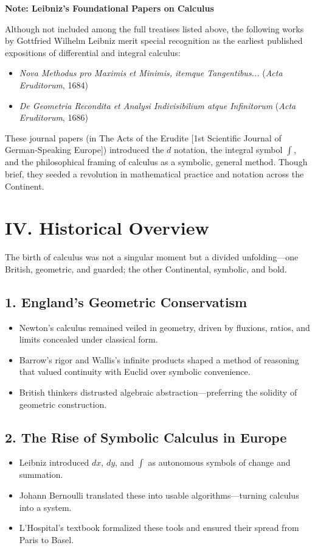 \documentclass[9pt]{article}
\begin{document}
\vspace{1em}
\noindent
\textbf{Note: Leibniz's Foundational Papers on Calculus}

\noindent
Although not included among the full treatises listed above, the following works by Gottfried Wilhelm Leibniz merit special recognition as the earliest published expositions of differential and integral calculus:

\begin{itemize}
  \item \textit{Nova Methodus pro Maximis et Minimis, itemque Tangentibus...} (\textit{Acta Eruditorum}, 1684)
  \item \textit{De Geometria Recondita et Analysi Indivisibilium atque Infinitorum} (\textit{Acta Eruditorum}, 1686)
\end{itemize}

These journal papers (in The Acts of the Erudite [1st Scientific Journal of German-Speaking Europe]) introduced the $d$ notation, the integral symbol $\int$, and the philosophical framing of calculus as a symbolic, general method. Though brief, they seeded a revolution in mathematical practice and notation across the Continent.

\newpage

\section*{IV. Historical Overview}

The birth of calculus was not a singular moment but a divided unfolding—one British, geometric, and guarded; the other Continental, symbolic, and bold.

\subsection*{1. England’s Geometric Conservatism}
\begin{itemize}
  \item Newton's calculus remained veiled in geometry, driven by fluxions, ratios, and limits concealed under classical form.
  \item Barrow's rigor and Wallis's infinite products shaped a method of reasoning that valued continuity with Euclid over symbolic convenience.
  \item British thinkers distrusted algebraic abstraction—preferring the solidity of geometric construction.
\end{itemize}

\subsection*{2. The Rise of Symbolic Calculus in Europe}
\begin{itemize}
  \item Leibniz introduced $dx$, $dy$, and $\int$ as autonomous symbols of change and summation.
  \item Johann Bernoulli translated these into usable algorithms—turning calculus into a system.
  \item L’Hospital's textbook formalized these tools and ensured their spread from Paris to Basel.
\end{itemize}
\end{document}
